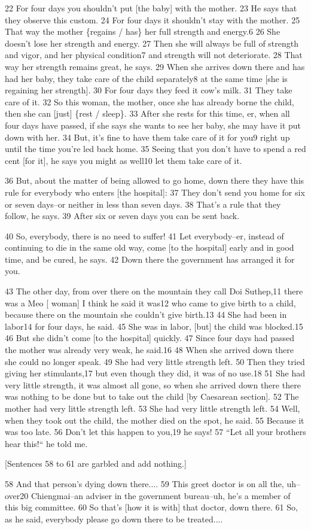22 For four days you shouldn't put [the baby] with the mother. 23 He says that
they observe this custom. 24 For four days it shouldn't stay with the mother. 25
That way the mother \{regains / has\} her full strength and energy.6 26 She doesn't
lose her strength and energy. 27 Then she will always be full of strength and vigor,
and her physical condition7 and strength will not deteriorate. 28 That way her
strength remains great, he says. 29 When she arrives down there and has had her
baby, they take care of the child separately8 at the same time [she is regaining
her strength]. 30 For four days they feed it cow's milk. 31 They take care of it.
32 So this woman, the mother, once she has already borne the child, then she can
[just] \{rest / sleep\}. 33 After she rests for this time, er, when all four days
have passed, if she says she wants to see her baby, she may have it put down with
her. 34 But, it's fine to have them take care of it for you9 right up until the
time you're led back home. 35 Seeing that you don't have to spend a red cent [for
it], he says you might as well10 let them take care of it.

36 But, about the matter of being allowed to go home, down there they have this
rule for everybody who enters [the hospital]: 37 They don't send you home for six
or seven days--or neither in less than seven days. 38 That's a rule that they follow,
he says. 39 After six or seven days you can be sent back.

40 So, everybody, there is no need to suffer! 41 Let everybody--er, instead of
continuing to die in the same old way, come [to the hospital] early and in good
time, and be cured, he says. 42 Down there the government has arranged it for you.

43 The other day, from over there on the mountain they call Doi Suthep,11 there
was a Meo [ woman] I think he said it was12 who came to give birth to a child,
because there on the mountain she couldn't give birth.13 44 She had been in labor14
for four days, he said. 45 She was in labor, [but] the child was blocked.15 46
But she didn't come [to the hospital] quickly. 47 Since four days had passed the
mother was already very weak, he said.16 48 When she arrived down there she could
no longer speak. 49 She had very little strength left. 50 Then they tried giving
her stimulants,17 but even though they did, it was of no use.18 51 She had very
little strength, it was almost all gone, so when she arrived down there there was
nothing to be done but to take out the child [by Caesarean section]. 52 The mother
had very little strength left. 53 She had very little strength left. 54 Well, when
they took out the child, the mother died on the spot, he said. 55 Because it was
too late. 56 Don't let this happen to you,19 he says! 57 ``Let all your
brothers hear this!`` he told me.

[Sentences 58 to 61 are garbled and add nothing.]

58 And that person's dying down there.... 59 This greet doctor is on all the, uh--over20
Chiengmai--an adviser in the government bureau--uh, he's a member of this big committee.
60 So that's [how it is with] that doctor, down there. 61 So, as he said, everybody
please go down there to be treated....

